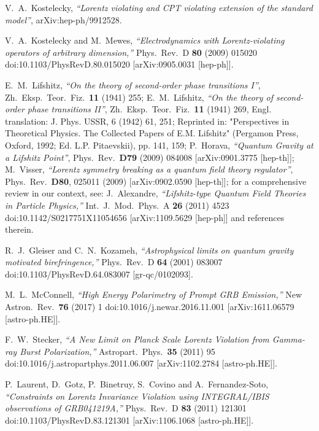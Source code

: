 \documentclass[12pt]{article}
\begin{document}
{\begin{thebibliography}{99}
  V.~A.~Kostelecky,
  {\it ``Lorentz violating and CPT violating extension of the standard model''},
  arXiv:hep-ph/9912528.

  V.~A.~Kostelecky and M.~Mewes,
  {\it ``Electrodynamics with Lorentz-violating operators of arbitrary dimension,''}
  Phys.\ Rev.\ D {\bf 80} (2009) 015020
  doi:10.1103/PhysRevD.80.015020
  [arXiv:0905.0031 [hep-ph]].

E.~M.~Lifshitz, {\it ``On the theory of second-order phase transitions I''},
Zh.\ Eksp.\ Teor.\ Fiz.\ {\bf 11} (1941) 255;
E.~M.~Lifshitz, {\it ``On the theory of second-order phase transitions II''},
Zh.\ Eksp.\ Teor.\ Fiz.\ {\bf 11} (1941) 269, Engl. translation: J. Phys. USSR, 6 (1942) 61, 251; Reprinted in:
   "Perspectives in Theoretical Physics. The Collected Papers of E.M.
   Lifshitz" (Pergamon Press, Oxford, 1992; Ed. L.P. Pitaevskii), pp. 141,
   159;
  P.~Horava,
  {\it ``Quantum Gravity at a Lifshitz Point''},
  Phys.\ Rev.\  {\bf D79 } (2009)  084008
  [arXiv:0901.3775 [hep-th]];
  M.~Visser,
  {\it ``Lorentz symmetry breaking as a quantum field theory regulator''},
  Phys.\ Rev.\  {\bf D80}, 025011 (2009)
  [arXiv:0902.0590 [hep-th]];
  for a comprehensive review in our context, see:
  J.~Alexandre, {\it ``Lifshitz-type Quantum Field Theories in Particle Physics,''}
  Int.\ J.\ Mod.\ Phys.\ A {\bf 26} (2011) 4523
  doi:10.1142/S0217751X11054656
  [arXiv:1109.5629 [hep-ph]] and references therein.

  R.~J.~Gleiser and C.~N.~Kozameh,
  {\it ``Astrophysical limits on quantum gravity motivated birefringence,''}
  Phys.\ Rev.\ D {\bf 64} (2001) 083007
  doi:10.1103/PhysRevD.64.083007
  [gr-qc/0102093].

  M.~L.~McConnell,
  {\it ``High Energy Polarimetry of Prompt GRB Emission,''}
  New Astron.\ Rev.\  {\bf 76} (2017) 1
  doi:10.1016/j.newar.2016.11.001
  [arXiv:1611.06579 [astro-ph.HE]].


  F.~W.~Stecker,
  {\it ``A New Limit on Planck Scale Lorentz Violation from Gamma-ray Burst Polarization,''}
  Astropart.\ Phys.\  {\bf 35} (2011) 95
  doi:10.1016/j.astropartphys.2011.06.007
  [arXiv:1102.2784 [astro-ph.HE]].

  P.~Laurent, D.~Gotz, P.~Binetruy, S.~Covino and A.~Fernandez-Soto,
  {\it ``Constraints on Lorentz Invariance Violation using INTEGRAL/IBIS observations of GRB041219A,''}
  Phys.\ Rev.\ D {\bf 83} (2011) 121301
  doi:10.1103/PhysRevD.83.121301
  [arXiv:1106.1068 [astro-ph.HE]].


\end{thebibliography}}
\end{document}
